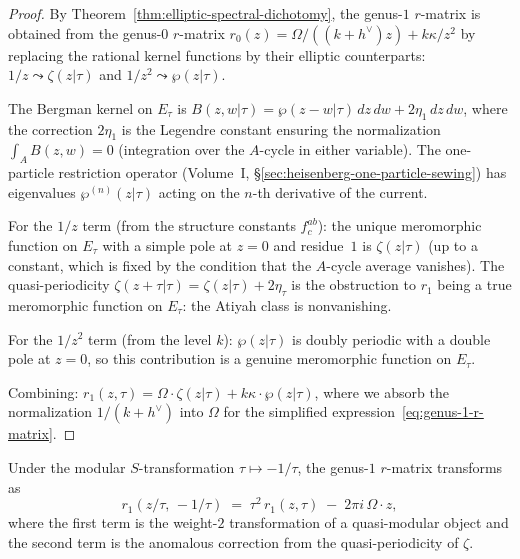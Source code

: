 \begin{proof}
By Theorem~\ref{thm:elliptic-spectral-dichotomy}, the genus-$1$
$r$-matrix is obtained from the genus-$0$ $r$-matrix
$r_0(z) = \Omega/((k+h^\vee)z) + k\kappa/z^2$ by replacing the
rational kernel functions by their elliptic counterparts:
$1/z \leadsto \zeta(z|\tau)$ and $1/z^2 \leadsto \wp(z|\tau)$.

The Bergman kernel on $E_\tau$ is
$B(z, w|\tau) = \wp(z-w|\tau)\, dz\, dw + 2\eta_1\, dz\, dw$,
where the correction $2\eta_1$ is the Legendre constant ensuring
the normalization $\int_{A} B(z, w) = 0$ (integration over the
$A$-cycle in either variable). The one-particle restriction
operator (Volume~I, \S\ref*{sec:heisenberg-one-particle-sewing})
has eigenvalues $\wp^{(n)}(z|\tau)$ acting on the $n$-th
derivative of the current.

For the $1/z$ term (from the structure constants $f^{ab}_c$):
the unique meromorphic function on $E_\tau$ with a simple pole
at $z = 0$ and residue~$1$ is $\zeta(z|\tau)$ (up to a constant,
which is fixed by the condition that the $A$-cycle average
vanishes). The quasi-periodicity
$\zeta(z+\tau|\tau) = \zeta(z|\tau) + 2\eta_\tau$ is the
obstruction to $r_1$ being a true meromorphic function on $E_\tau$:
the Atiyah class is nonvanishing.

For the $1/z^2$ term (from the level $k$): $\wp(z|\tau)$ is
doubly periodic with a double pole at $z = 0$, so this
contribution is a genuine meromorphic function on $E_\tau$.

Combining: $r_1(z, \tau) = \Omega \cdot \zeta(z|\tau) + k\kappa
\cdot \wp(z|\tau)$, where we absorb the normalization
$1/(k+h^\vee)$ into $\Omega$ for the simplified
expression~\eqref{eq:genus-1-r-matrix}.
\end{proof}

\begin{proposition}
Under the modular $S$-transformation $\tau \mapsto -1/\tau$, the
genus-$1$ $r$-matrix transforms as
\begin{equation}
r_1(z/\tau,\, -1/\tau)
\;=\;
\tau^2\, r_1(z, \tau)
\;-\;
2\pi i\, \Omega \cdot z,
\end{equation}
where the first term is the weight-$2$ transformation of a
quasi-modular object and the second term is the anomalous
correction from the quasi-periodicity of $\zeta$.
\end{proposition}

